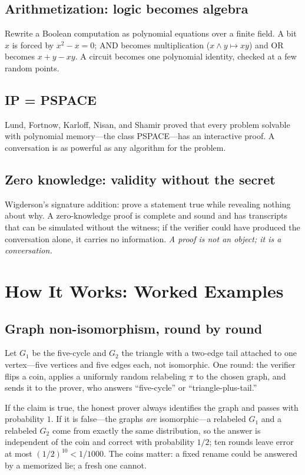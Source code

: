\subsection{Arithmetization: logic becomes algebra}
Rewrite a Boolean computation as polynomial equations over a finite field. A bit $x$ is forced by $x^2-x=0$; AND becomes multiplication ($x\wedge y\mapsto xy$) and OR becomes $x+y-xy$. A circuit becomes one polynomial identity, checked at a few random points.

\subsection{IP = PSPACE}
Lund, Fortnow, Karloff, Nisan, and Shamir proved that every problem solvable with polynomial memory---the class PSPACE---has an interactive proof. A conversation is as powerful as any algorithm for the problem.

\subsection{Zero knowledge: validity without the secret}
Wigderson's signature addition: prove a statement true while revealing nothing about why. A zero-knowledge proof is complete and sound and has transcripts that can be simulated without the witness; if the verifier could have produced the conversation alone, it carries no information. \emph{A proof is not an object; it is a conversation.}

\section{How It Works: Worked Examples}
\subsection{Graph non-isomorphism, round by round}
Let $G_1$ be the five-cycle and $G_2$ the triangle with a two-edge tail attached to one vertex---five vertices and five edges each, not isomorphic. One round: the verifier flips a coin, applies a uniformly random relabeling $\pi$ to the chosen graph, and sends it to the prover, who answers ``five-cycle'' or ``triangle-plus-tail.''

If the claim is true, the honest prover always identifies the graph and passes with probability $1$. If it is false---the graphs \emph{are} isomorphic---a relabeled $G_1$ and a relabeled $G_2$ come from exactly the same distribution, so the answer is independent of the coin and correct with probability $1/2$; ten rounds leave error at most $(1/2)^{10}<1/1000$. The coins matter: a fixed rename could be answered by a memorized lie; a fresh one cannot.


